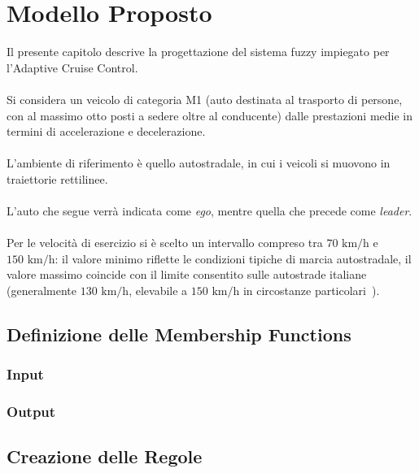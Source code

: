 \chapter{Modello Proposto}

Il presente capitolo descrive la progettazione del sistema fuzzy impiegato per l'Adaptive Cruise Control.  
\\\\
Si considera un veicolo di categoria M1 (auto destinata al trasporto di persone, con al massimo otto posti a sedere oltre al conducente)
dalle prestazioni medie in termini di accelerazione e decelerazione.  
\\\\
L'ambiente di riferimento è quello autostradale, in cui i veicoli si muovono in traiettorie rettilinee.  
\\\\
L'auto che segue verrà indicata come \emph{ego}, mentre quella che precede come \emph{leader}.  
\\\\
Per le velocità di esercizio si è scelto un intervallo compreso tra \(70\text{ km/h}\) e \(150\text{ km/h}\): il valore minimo riflette le condizioni tipiche di marcia autostradale, il valore massimo coincide con il limite consentito sulle autostrade italiane (generalmente \(130\text{ km/h}\), elevabile a \(150\text{ km/h}\) in circostanze particolari~\cite{limite_autostrada_150}).  



\section{Definizione delle Membership Functions}
\subsection{Input}
\subsection{Output}

\section{Creazione delle Regole}